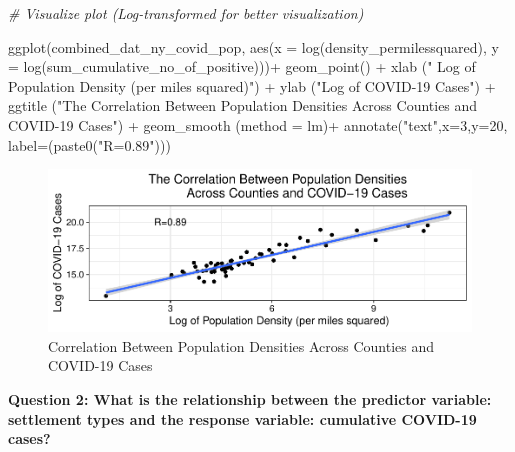 \documentclass[
  12pt,
]{article}
\newenvironment{Shaded}{\begin{snugshade}}{\end{snugshade}}
\newcommand{\AttributeTok}[1]{\textcolor[rgb]{0.77,0.63,0.00}{#1}}
\newcommand{\CommentTok}[1]{\textcolor[rgb]{0.56,0.35,0.01}{\textit{#1}}}
\newcommand{\DecValTok}[1]{\textcolor[rgb]{0.00,0.00,0.81}{#1}}
\newcommand{\FunctionTok}[1]{\textcolor[rgb]{0.00,0.00,0.00}{#1}}
\newcommand{\NormalTok}[1]{#1}
\newcommand{\SpecialCharTok}[1]{\textcolor[rgb]{0.00,0.00,0.00}{#1}}
\newcommand{\StringTok}[1]{\textcolor[rgb]{0.31,0.60,0.02}{#1}}
\begin{document}
\begin{Shaded}
\begin{Highlighting}[]
\CommentTok{\# Visualize plot (Log{-}transformed for better visualization)}

\FunctionTok{ggplot}\NormalTok{(combined\_dat\_ny\_covid\_pop, }\FunctionTok{aes}\NormalTok{(}\AttributeTok{x =} \FunctionTok{log}\NormalTok{(density\_permilessquared),}
                                      \AttributeTok{y =} \FunctionTok{log}\NormalTok{(sum\_cumulative\_no\_of\_positive)))}\SpecialCharTok{+}
  \FunctionTok{geom\_point}\NormalTok{() }\SpecialCharTok{+}
  \FunctionTok{xlab}\NormalTok{ (}\StringTok{" Log of Population Density (per miles squared)"}\NormalTok{) }\SpecialCharTok{+}
  \FunctionTok{ylab}\NormalTok{ (}\StringTok{"Log of COVID{-}19 Cases"}\NormalTok{) }\SpecialCharTok{+}
  \FunctionTok{ggtitle}\NormalTok{ (}\StringTok{"The Correlation Between Population Densities}
\StringTok{           Across Counties and COVID{-}19 Cases"}\NormalTok{) }\SpecialCharTok{+}
  \FunctionTok{geom\_smooth}\NormalTok{ (}\AttributeTok{method =} \StringTok{\textquotesingle{}lm\textquotesingle{}}\NormalTok{)}\SpecialCharTok{+}
  \FunctionTok{annotate}\NormalTok{(}\StringTok{"text"}\NormalTok{,}\AttributeTok{x=}\DecValTok{3}\NormalTok{,}\AttributeTok{y=}\DecValTok{20}\NormalTok{, }\AttributeTok{label=}\NormalTok{(}\FunctionTok{paste0}\NormalTok{(}\StringTok{"R=0.89"}\NormalTok{)))}
\end{Highlighting}
\end{Shaded}

\begin{figure}

\includegraphics{EDA_Final_Group_Project_files/figure-latex/unnamed-chunk-23-1} \hfill{}

\caption{Correlation Between Population Densities Across Counties and COVID-19 Cases}\label{fig:unnamed-chunk-23}
\end{figure}

\textbf{Question 2: What is the relationship between the predictor
variable: settlement types and the response variable: cumulative
COVID-19 cases?}
\end{document}
